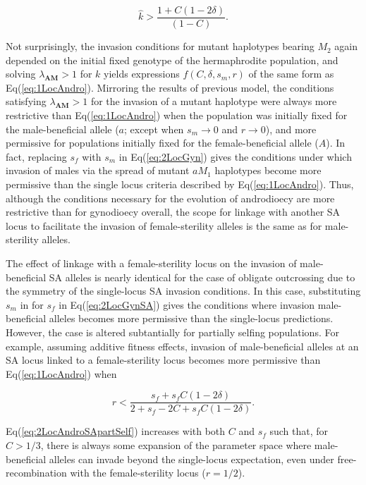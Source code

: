 \documentclass[9pt,twocolumn,twoside,lineno]{gsajnl}
\begin{document}
\begin{equation}\label{eq:1LocAndro}
	\hat{k} > \frac{1 + C (1 - 2 \delta)}{(1 - C)}.
\end{equation}

\noindent Not surprisingly, the invasion conditions for mutant haplotypes bearing $M_2$ again depended on the initial fixed genotype of the hermaphrodite population, and solving $\lambda_{\mathbf{AM}} > 1$ for $k$ yields expressions $f(C,\delta,s_m,r)$ of the same form as Eq(\ref{eq:1LocAndro}). Mirroring the results of previous model, the conditions satisfying $\lambda_{\mathbf{AM}} > 1$ for the invasion of a mutant haplotype were always more restrictive than Eq(\ref{eq:1LocAndro}) when the population was initially fixed for the male-beneficial allele ($a$; except when $s_m \rightarrow 0$ and $r \rightarrow 0$), and more permissive for populations initially fixed for the female-beneficial allele ($A$). In fact, replacing $s_f$ with $s_m$ in Eq(\ref{eq:2LocGyn}) gives the conditions under which invasion of males via the spread of mutant $aM_1$ haplotypes become more permissive than the single locus criteria described by Eq(\ref{eq:1LocAndro}). Thus, although the conditions necessary for the evolution of androdioecy are more restrictive than for gynodioecy overall, the scope for linkage with another SA locus to facilitate the invasion of female-sterility alleles is the same as for male-sterility alleles. 

The effect of linkage with a female-sterility locus on the invasion of male-beneficial SA alleles is nearly identical for the case of obligate outcrossing due to the symmetry of the single-locus SA invasion conditions. In this case, substituting $s_m$ in for $s_f$ in Eq(\ref{eq:2LocGynSA}) gives the conditions where invasion male-beneficial alleles becomes more permissive than the single-locus predictions. However, the case is altered subtantially for partially selfing populations. For example, assuming additive fitness effects, invasion of male-beneficial alleles at an SA locus linked to a female-sterility locus becomes more permissive than Eq(\ref{eq:1LocAndro}) when

\begin{equation}\label{eq:2LocAndroSApartSelf}
	r < \frac{s_f + s_f C (1 - 2 \delta)}{2 + s_f - 2 C + s_f C (1 - 2 \delta)}.
\end{equation}

\noindent Eq(\ref{eq:2LocAndroSApartSelf}) increases with both $C$ and $s_f$ such that, for $C > 1/3$, there is always some expansion of the parameter space where male-beneficial alleles can invade beyond the single-locus expectation, even under free-recombination with the female-sterility locus ($r = 1/2$). 
\end{document}
